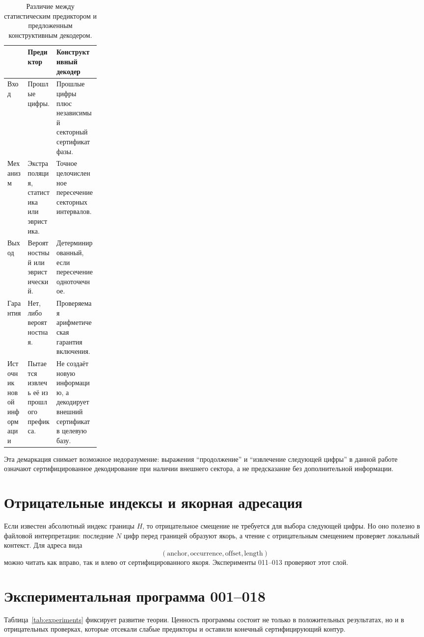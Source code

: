 \documentclass[11pt,a4paper]{article}
\begin{document}
\begin{table}[H]
\centering
\small
\begin{tabularx}{\linewidth}{>{\raggedright\arraybackslash}p{0.22\linewidth}XX}
\toprule
 & Предиктор & Конструктивный декодер \\
\midrule
Вход & Прошлые цифры. & Прошлые цифры плюс независимый секторный сертификат фазы. \\
Механизм & Экстраполяция, статистика или эвристика. & Точное целочисленное пересечение секторных интервалов. \\
Выход & Вероятностный или эвристический. & Детерминированный, если пересечение одноточечное. \\
Гарантия & Нет, либо вероятностная. & Проверяемая арифметическая гарантия включения. \\
Источник новой информации & Пытается извлечь её из прошлого префикса. & Не создаёт новую информацию, а декодирует внешний сертификат в целевую базу. \\
\bottomrule
\end{tabularx}
\caption{Различие между статистическим предиктором и предложенным конструктивным декодером.}
\end{table}

Эта демаркация снимает возможное недоразумение: выражения ``продолжение'' и ``извлечение следующей цифры'' в данной работе означают сертифицированное декодирование при наличии внешнего сектора, а не предсказание без дополнительной информации.

\section{Отрицательные индексы и якорная адресация}

Если известен абсолютный индекс границы $H$, то отрицательное смещение не требуется для выбора следующей цифры.  Но оно полезно в файловой интерпретации: последние $N$ цифр перед границей образуют якорь, а чтение с отрицательным смещением проверяет локальный контекст.  Для адреса вида
\[
  (\text{anchor},\text{occurrence},\text{offset},\text{length})
\]
можно читать как вправо, так и влево от сертифицированного якоря.  Эксперименты 011--013 проверяют этот слой.

\section{Экспериментальная программа 001--018}

Таблица~\ref{tab:experiments} фиксирует развитие теории.  Ценность программы состоит не только в положительных результатах, но и в отрицательных проверках, которые отсекали слабые предикторы и оставили конечный сертифицирующий контур.
\end{document}
